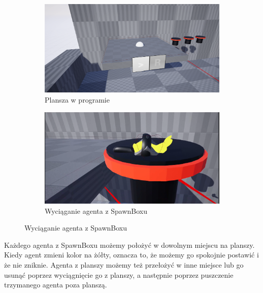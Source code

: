 \documentclass[a4paper,12pt,reqno]{article}
\begin{document}
\begin{figure}[H]%
	\centering
	\begin{subfigure}{.5\textwidth}
		\centering
		\includegraphics[width=0.8\linewidth]{graphics//agent/AgentInUE_1.png}
		\caption{Plansza w programie}	
		\label{ref:subref_a}
	\end{subfigure}%
	\begin{subfigure}{.5\textwidth}
		\centering
		\includegraphics[width=0.8\linewidth]{graphics//agent/AgentInUE_2.png}
		\caption{Wyciąganie agenta z SpawnBoxu}
		\label{ref:subref_b}
	\end{subfigure}%
\label{ref:ref}
\end{figure}

Każdego agenta z SpawnBoxu możemy położyć w dowolnym miejscu na planszy. Kiedy agent zmieni kolor na żółty, oznacza to, że możemy go spokojnie postawić i że nie zniknie. Agenta z planszy możemy też przełożyć w inne miejsce lub go usunąć poprzez wyciągnięcie go z planszy, a następnie poprzez puszczenie trzymanego agenta poza planszą.
\end{document}
